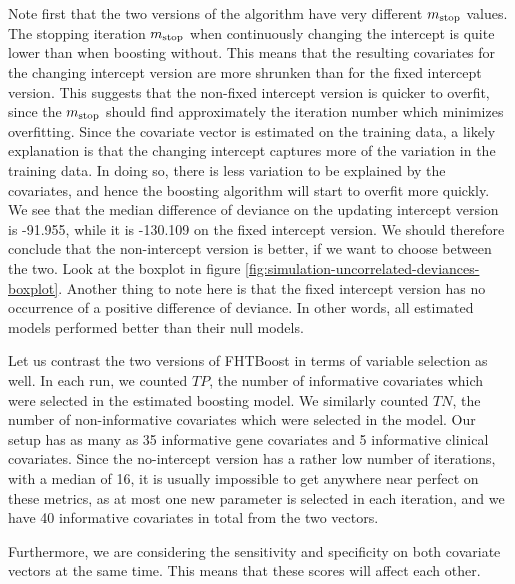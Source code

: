 Note first that the two versions of the algorithm have very different $m_{\text{stop}}$ values.
The stopping iteration $m_{\text{stop}}$ when continuously changing the intercept is quite lower than when boosting without.
This means that the resulting covariates for the changing intercept version are more shrunken than for the fixed intercept version.
This suggests that the non-fixed intercept version is quicker to overfit, since the $m_{\text{stop}}$ should find approximately the iteration number which minimizes overfitting.
Since the covariate vector is estimated on the training data, a likely explanation is that the changing intercept captures more of the variation in the training data.
In doing so, there is less variation to be explained by the covariates, and hence the boosting algorithm will start to overfit more quickly.
We see that the median difference of deviance on the updating intercept version is -91.955, while it is -130.109 on the fixed intercept version.
We should therefore conclude that the non-intercept version is better, if we want to choose between the two.
Look at the boxplot in figure \ref{fig:simulation-uncorrelated-deviances-boxplot}.
Another thing to note here is that the fixed intercept version has no occurrence of a positive difference of deviance.
In other words, all estimated models performed better than their null models.

Let us contrast the two versions of FHTBoost in terms of variable selection as well.
In each run, we counted $TP$, the number of informative covariates which were selected in the estimated boosting model.
We similarly counted $TN$, the number of non-informative covariates which were selected in the model.
Our setup has as many as 35 informative gene covariates and 5 informative clinical covariates.
Since the no-intercept version has a rather low number of iterations, with a median of 16, it is usually impossible to get anywhere near perfect on these metrics, as at most one new parameter is selected in each iteration, and we have 40 informative covariates in total from the two vectors.

Furthermore, we are considering the sensitivity and specificity on both covariate vectors at the same time.
This means that these scores will affect each other.

